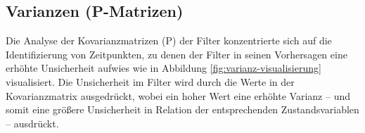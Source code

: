 \documentclass[conference]{IEEEtran}[10pt]
\begin{document}







\subsection{Varianzen (P-Matrizen)}

Die Analyse der Kovarianzmatrizen (P) der Filter konzentrierte sich auf die Identifizierung von Zeitpunkten, zu denen der Filter in seinen Vorhersagen eine erhöhte Unsicherheit aufwies wie in Abbildung \ref{fig:varianz-visualisierung} visualisiert. Die Unsicherheit im Filter wird durch die Werte in der Kovarianzmatrix ausgedrückt, wobei ein hoher Wert eine erhöhte Varianz  -- und somit eine größere Unsicherheit in Relation der entsprechenden Zustandsvariablen  -- ausdrückt.
\end{document}

